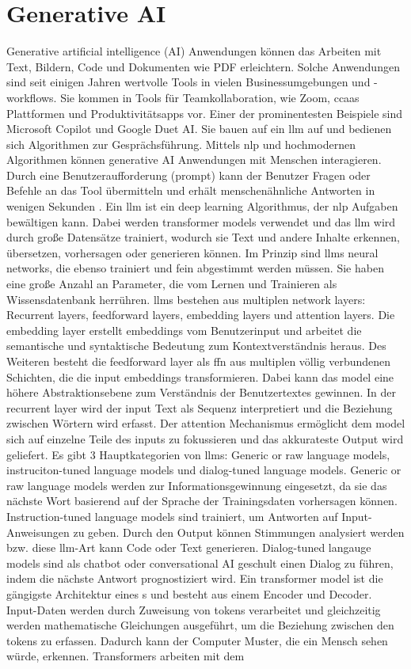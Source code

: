 \section{Generative AI}
Generative artificial intelligence (AI) Anwendungen können das Arbeiten mit Text, Bildern, Code und Dokumenten wie PDF erleichtern. Solche Anwendungen sind seit einigen Jahren wertvolle Tools in vielen Businessumgebungen und -workflows. Sie kommen in Tools für Teamkollaboration, wie Zoom, \gls{ccaas} Plattformen und Produktivitätsapps vor. Einer der prominentesten Beispiele sind Microsoft Copilot und Google Duet AI. Sie bauen auf ein \gls{llm} auf und bedienen sich Algorithmen zur Gesprächsführung. Mittels \gls{nlp} und hochmodernen Algorithmen können generative AI Anwendungen mit Menschen interagieren. Durch eine Benutzeraufforderung (prompt) kann der Benutzer Fragen oder Befehle an das Tool übermitteln und erhält menschenähnliche Antworten in wenigen Sekunden \cite{copilot-duet}. Ein \gls{llm} ist ein deep learning Algorithmus, der \gls{nlp} Aufgaben bewältigen kann. Dabei werden transformer models verwendet und das \gls{llm} wird durch große Datensätze trainiert, wodurch sie Text und andere Inhalte erkennen, übersetzen, vorhersagen oder generieren können. Im Prinzip sind \gls{llm}s neural networks, die ebenso trainiert und fein abgestimmt werden müssen. Sie haben eine große Anzahl an Parameter, die vom Lernen und Trainieren als Wissensdatenbank herrühren. \gls{llm}s bestehen aus multiplen network layers: Recurrent layers, feedforward layers, embedding layers und attention layers. Die embedding layer erstellt embeddings vom Benutzerinput und arbeitet die semantische und syntaktische Bedeutung zum Kontextverständnis heraus. Des Weiteren besteht die feedforward layer als \gls{ffn} aus multiplen völlig verbundenen Schichten, die die input embeddings transformieren. Dabei kann das model eine höhere Abstraktionsebene zum Verständnis der Benutzertextes gewinnen. In der recurrent layer wird der input Text als Sequenz interpretiert und die Beziehung zwischen Wörtern wird erfasst. Der attention Mechanismus ermöglicht dem model sich auf einzelne Teile des inputs zu fokussieren und das akkurateste Output wird geliefert. Es gibt 3 Hauptkategorien von \gls{llm}s: Generic or raw language models, instruciton-tuned language models und dialog-tuned language models. Generic or raw language models werden zur Informationsgewinnung eingesetzt, da sie das nächste Wort basierend auf der Sprache der Trainingsdaten vorhersagen können. Instruction-tuned language models sind trainiert, um Antworten auf Input-Anweisungen zu geben. Durch den Output können Stimmungen analysiert werden bzw. diese \gls{llm}-Art kann Code oder Text generieren. Dialog-tuned langauge models sind als chatbot oder conversational AI geschult einen Dialog zu führen, indem die nächste Antwort prognostiziert wird. Ein transformer model ist die gängigste Architektur eines s und besteht aus einem Encoder und Decoder. Input-Daten werden durch Zuweisung von tokens verarbeitet und gleichzeitig werden mathematische Gleichungen ausgeführt, um die Beziehung zwischen den tokens zu erfassen. Dadurch kann der Computer Muster, die ein Mensch sehen würde, erkennen. Transformers arbeiten mit dem 